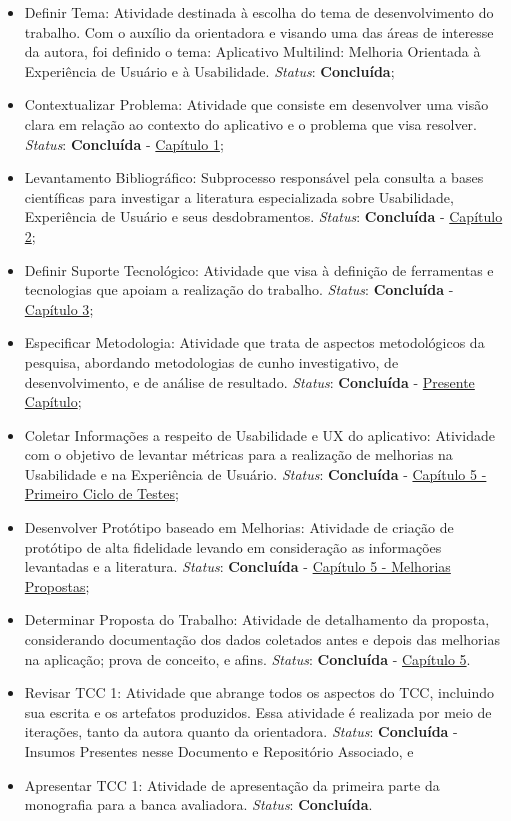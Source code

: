 \begin{itemize}
	\item Definir Tema: Atividade destinada à escolha do tema de desenvolvimento do trabalho. Com o auxílio da orientadora e visando uma das áreas de interesse da autora, foi definido o tema: Aplicativo Multilind: Melhoria Orientada à
	Experiência de Usuário e à Usabilidade. \textit{Status}: \textbf{Concluída};
	\item Contextualizar Problema: Atividade que consiste em desenvolver uma visão clara em relação ao contexto do aplicativo e o problema que visa resolver. \textit{Status}: \textbf{Concluída} - \hyperref[chap:Introducao]{Capítulo 1};
	\item Levantamento Bibliográfico: Subprocesso responsável pela consulta a bases científicas para investigar a literatura especializada sobre Usabilidade, Experiência de Usuário e seus desdobramentos. \textit{Status}: \textbf{Concluída} - \hyperref[chap:Referencial]{Capítulo 2};
	\item Definir Suporte Tecnológico: Atividade que visa à definição de ferramentas e tecnologias que apoiam a realização do trabalho. \textit{Status}: \textbf{Concluída} - \hyperref[chap:ReferencialTech]{Capítulo 3};
	\item Especificar Metodologia: Atividade que trata de aspectos metodológicos da  pesquisa, abordando metodologias de cunho investigativo, de desenvolvimento, e de análise de resultado. \textit{Status}: \textbf{Concluída} - \hyperref[chap:Metodologia]{Presente Capítulo};
	\item Coletar Informações a respeito de Usabilidade e UX do aplicativo: Atividade com o objetivo de levantar métricas para a realização de melhorias na Usabilidade e na Experiência de Usuário. \textit{Status}: \textbf{Concluída} - \hyperref[sec:Primeiro Ciclo]{Capítulo 5 - Primeiro Ciclo de Testes};
	\item Desenvolver Protótipo baseado em Melhorias: Atividade de criação de protótipo de alta fidelidade levando em consideração as informações levantadas e a literatura. \textit{Status}: \textbf{Concluída} - \hyperref[sec:Melhorias Propostas]{Capítulo 5 - Melhorias Propostas};
	\item Determinar Proposta do Trabalho: Atividade de detalhamento da proposta, considerando documentação dos dados coletados antes e depois das melhorias na aplicação; prova de conceito, e afins. \textit{Status}: \textbf{Concluída} - \hyperref[chap:Aplicativo Multilind]{Capítulo 5}.
	\item Revisar TCC 1: Atividade que abrange todos os aspectos do TCC, incluindo sua escrita e os artefatos produzidos. Essa atividade é realizada por meio de iterações, tanto da autora quanto da orientadora. \textit{Status}: \textbf{Concluída} -  Insumos Presentes nesse Documento e Repositório Associado, e
	\item Apresentar TCC 1: Atividade de apresentação da primeira parte da monografia para a banca avaliadora. \textit{Status}: \textbf{Concluída}.
\end{itemize}

